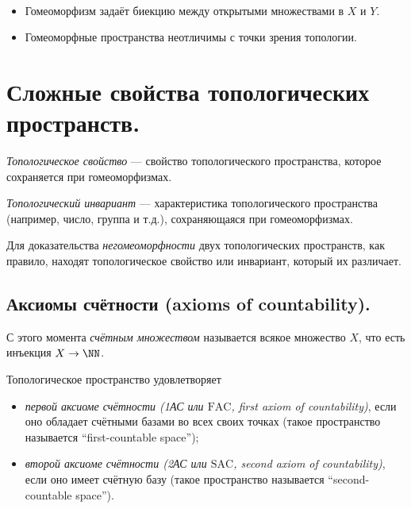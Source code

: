 \documentclass[12pt,a4paper]{article}
\newcommand{\FAC}{\ensuremath{\mathrm{FAC}}\xspace}
\newcommand{\SAC}{\ensuremath{\mathrm{SAC}}\xspace}
\begin{document}
    \begin{remark}\ 
        \begin{itemize}
            \item Гомеоморфизм задаёт биекцию между открытыми множествами в $X$ и $Y$.
            \item Гомеоморфные пространства неотличимы с точки зрения топологии.
        \end{itemize}
    \end{remark}

    \section{Сложные свойства топологических пространств.}

    \begin{definition}
        \emph{Топологическое свойство} --- свойство топологического пространства, которое сохраняется при гомеоморфизмах.

        \emph{Топологический инвариант} --- характеристика топологического пространства (например, число, группа и т.д.), сохраняющаяся при гомеоморфизмах.
    \end{definition}

    \begin{remark*}
        Для доказательства \emph{негомеоморфности} двух топологических пространств, как правило, находят топологическое свойство или инвариант, который их различает.
    \end{remark*}

    \subsection{Аксиомы счётности (axioms of countability).}

    \begin{remark*}
        С этого момента \emph{счётным множеством} называется всякое множество $X$, что есть инъекция $X \to \NN$. 
    \end{remark*}

    \begin{definition}
        Топологическое пространство удовлетворяет
        \begin{itemize}
            \item \emph{первой аксиоме счётности (1АС или \FAC , first axiom of countability)}, если оно обладает счётными базами во всех своих точках (такое пространство называется ``first-countable space'');
            \item \emph{второй аксиоме счётности (2АС или \SAC , second axiom of countability)}, если оно имеет счётную базу (такое пространство называется ``second-countable space'').
        \end{itemize}
    \end{definition}
\end{document}
